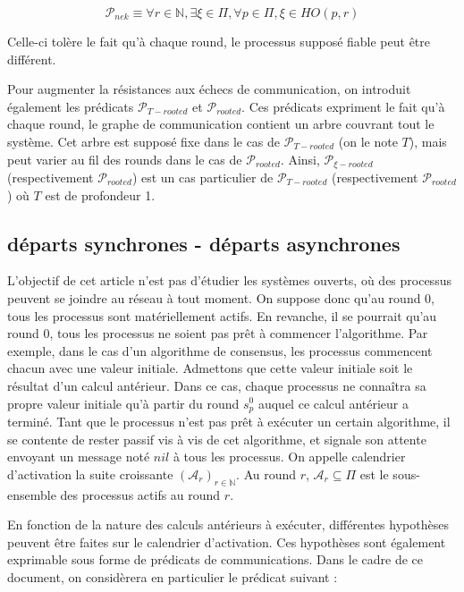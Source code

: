 \documentclass{article}
\begin{document}
$$\mathcal{P}_{nek} \equiv \forall r \in \mathds{N}, \exists \xi \in \Pi, \forall p \in \Pi, \xi \in HO(p,r)$$

Celle-ci tolère le fait qu'à chaque round, le processus supposé fiable peut être différent.

Pour augmenter la résistances aux échecs de communication, on introduit également les prédicats $\mathcal{P}_{T-rooted}$ et $\mathcal{P}_{rooted}$.
Ces prédicats expriment le fait qu'à chaque round, le graphe de communication contient un arbre couvrant tout le système.
Cet arbre est supposé fixe dans le cas de $\mathcal{P}_{T-rooted}$ (on le note $T$), mais peut varier au fil des rounds dans le cas de $\mathcal{P}_{rooted}$.
Ainsi, $\mathcal{P}_{\xi-rooted}$ (respectivement $\mathcal{P}_{rooted}$) est un cas particulier de $\mathcal{P}_{T-rooted}$ (respectivement $\mathcal{P}_{rooted}$) où $T$ est de profondeur 1.

\subsection{départs synchrones - départs asynchrones}

L'objectif de cet article n'est pas d'étudier les systèmes ouverts, où des processus peuvent se joindre au réseau à tout moment.
On suppose donc qu'au round 0, tous les processus sont matériellement actifs. En revanche, il se pourrait qu'au round 0, tous les processus ne soient pas prêt à commencer l'algorithme.
Par exemple, dans le cas d'un algorithme de consensus, les processus commencent chacun avec une valeur initiale. Admettons que cette valeur initiale soit le résultat d'un calcul antérieur.
Dans ce cas, chaque processus ne connaîtra sa propre valeur initiale qu'à partir du round $s^0_p$ auquel ce calcul antérieur a terminé.
Tant que le processus n'est pas prêt à exécuter un certain algorithme, il se contente de rester passif vis à vis de cet algorithme,
et signale son attente envoyant un message noté $nil$ à tous les processus.
On appelle calendrier d'activation la suite croissante $(\mathcal{A}_r)_{r \in \mathds{N}}$. Au round $r$, $\mathcal{A}_r \subseteq \Pi$ est le sous-ensemble des processus actifs au round $r$.

En fonction de la nature des calculs antérieurs à exécuter, différentes hypothèses peuvent être faites sur le calendrier d'activation.
Ces hypothèses sont également exprimable sous forme de prédicats de communications.
Dans le cadre de ce document, on considèrera en particulier le prédicat suivant :
\end{document}
